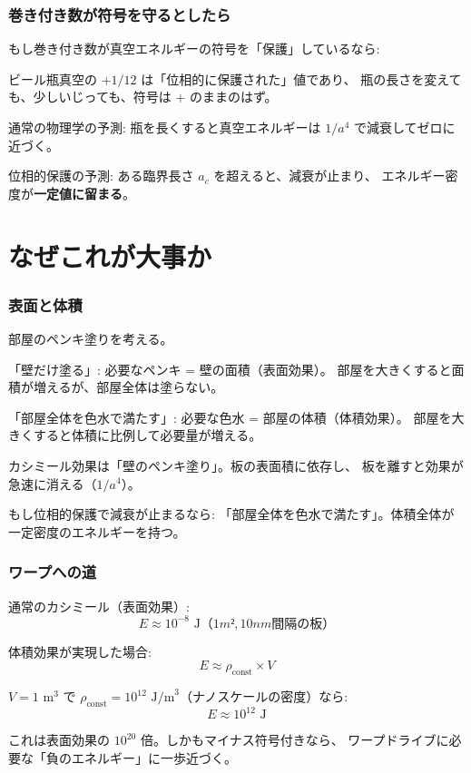 \documentclass[12pt,a4paper]{article}
\begin{document}
\section{巻き付き数が符号を守るとしたら}

\begin{resultbox}[予想]
もし巻き付き数が真空エネルギーの符号を「保護」しているなら:

ビール瓶真空の $+1/12$ は「位相的に保護された」値であり、
瓶の長さを変えても、少しいじっても、符号は $+$ のままのはず。

通常の物理学の予測:
瓶を長くすると真空エネルギーは $1/a^4$ で減衰してゼロに近づく。

位相的保護の予測:
ある臨界長さ $a_c$ を超えると、減衰が止まり、
エネルギー密度が\textbf{一定値に留まる}。
\end{resultbox}

\part{なぜこれが大事か}

\section{表面と体積}

\begin{storybox}[壁のペンキ塗り]
部屋のペンキ塗りを考える。

「壁だけ塗る」: 必要なペンキ = 壁の面積（表面効果）。
部屋を大きくすると面積が増えるが、部屋全体は塗らない。

「部屋全体を色水で満たす」: 必要な色水 = 部屋の体積（体積効果）。
部屋を大きくすると体積に比例して必要量が増える。

カシミール効果は「壁のペンキ塗り」。板の表面積に依存し、
板を離すと効果が急速に消える（$1/a^4$）。

もし位相的保護で減衰が止まるなら:
「部屋全体を色水で満たす」。体積全体が一定密度のエネルギーを持つ。
\end{storybox}

\section{ワープへの道}

\begin{resultbox}[体積効果の意味]

通常のカシミール（表面効果）:
$$E \approx 10^{-8} \text{ J}（1m², 10nm間隔の板）$$

体積効果が実現した場合:
$$E \approx \rho_{\text{const}} \times V$$

$V = 1 \text{ m}^3$ で $\rho_{\text{const}} = 10^{12} \text{ J/m}^3$（ナノスケールの密度）なら:
$$E \approx 10^{12} \text{ J}$$

これは表面効果の $10^{20}$ 倍。しかもマイナス符号付きなら、
ワープドライブに必要な「負のエネルギー」に一歩近づく。
\end{resultbox}
\end{document}
